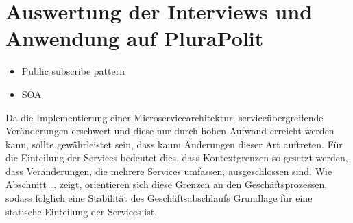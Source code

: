\section{Auswertung der Interviews und Anwendung auf PluraPolit}

\begin{itemize}
	\item Public subscribe pattern
	\item SOA 
\end{itemize}

Da die Implementierung einer Microservicearchitektur, serviceübergreifende Veränderungen erschwert und diese nur durch hohen Aufwand erreicht werden kann, sollte gewährleistet sein, dass kaum Änderungen dieser Art auftreten. Für die Einteilung der Services bedeutet dies, dass Kontextgrenzen so gesetzt werden, dass Veränderungen, die mehrere Services umfassen, ausgeschlossen sind. Wie Abschnitt … zeigt, orientieren sich diese Grenzen an den Geschäftsprozessen, sodass folglich eine Stabilität des Geschäftsabschlaufs Grundlage für eine statische Einteilung der Services ist.